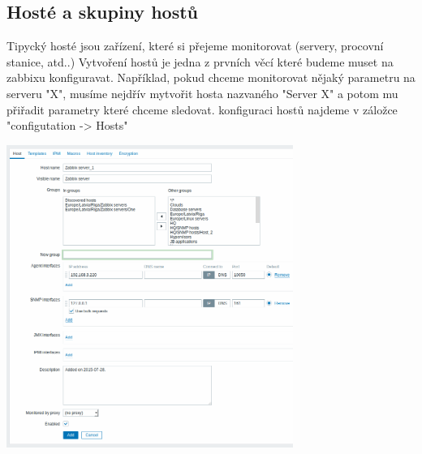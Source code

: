 \documentclass{article}
\begin{document}
\subsection{Hosté a skupiny hostů}
Tipycký hosté jsou zařízení, které si přejeme monitorovat (servery, procovní stanice, atd..) Vytvoření hostů je jedna z prvních věcí které budeme muset na zabbixu konfiguravat. Například, pokud chceme monitorovat nějaký parametru na serveru "X", musíme nejdřív mytvořit hosta nazvaného "Server X" a potom mu přiřadit parametry které chceme sledovat.
\newline
konfiguraci hostů najdeme v záložce "configutation -> Hosts"
\begin{center}
  \includegraphics[width=0.7\textwidth]{obrazky/host_a.png}
\end{center}
\end{document}

